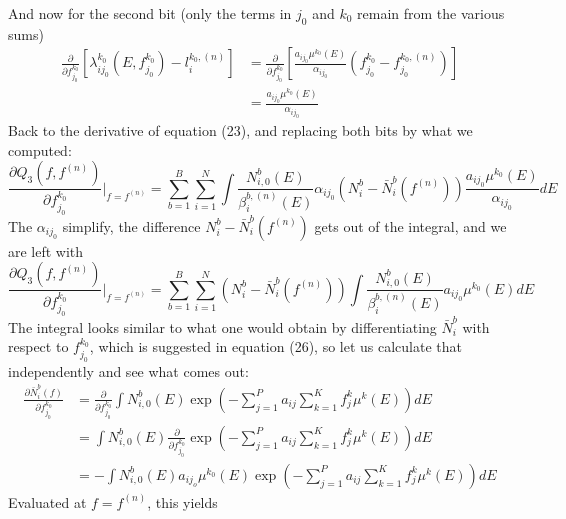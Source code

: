 \documentclass[a4paper, 10pt]{article}
\begin{document}
And now for the second bit (only the terms in $j_0$ and $k_0$ remain from the various sums)
\begin{equation*}
 \begin{split}
   \frac{\partial }{\partial f_{j_0}^{k_0}}\left[ \lambda_{ij_0}^{k_0}(E, f_{j_0}^{k_0}) - l_i^{k_0, (n)} \right] &= \frac{\partial }{\partial f_{j_0}^{k_0}} \left[ \frac{a_{ij_0} \mu^{k_0}(E)}{\alpha_{ij_0}}\left( f_{j_0}^{k_0} - f_{j_0}^{k_0, (n)}\right) \right] \\
   &= \frac{a_{ij_0} \mu^{k_0}(E)}{\alpha_{ij_0}}
 \end{split}
\end{equation*}
Back to the derivative of equation (23), and replacing both bits by what we computed:
\begin{equation*}
  \frac{\partial Q_3\left( f,f^{(n)}\right)}{\partial f_{j_0}^{k_0}}\Bigr|_{f = f^{(n)}} = \sum_{b=1}^B \sum_{i=1}^N \int \frac{N_{i,0}^b(E)}{\beta_i^{b, (n)}(E)} \alpha_{ij_0} \left( N_i^b - \bar{N}_i^b(f^{(n)}) \right) \frac{a_{ij_0} \mu^{k_0}(E)}{\alpha_{ij_0}} dE
\end{equation*}
The $\alpha_{ij_0}$ simplify, the difference $N_i^b - \bar{N}_i^b(f^{(n)})$ gets out of the integral, and we are left with 
\begin{equation*}
  \frac{\partial Q_3\left( f,f^{(n)}\right)}{\partial f_{j_0}^{k_0}}\Bigr|_{f = f^{(n)}} = \sum_{b=1}^B \sum_{i=1}^N \left( N_i^b - \bar{N}_i^b(f^{(n)}) \right) \int \frac{N_{i,0}^b(E)}{\beta_i^{b, (n)}(E)} a_{ij_0} \mu^{k_0}(E) dE
\end{equation*}
The integral looks similar to what one would obtain by differentiating $\bar{N}^b_i$ with respect to $f_{j_0}^{k_0}$, which is suggested in equation (26), so let us calculate that independently and see what comes out:
\begin{equation*}
 \begin{split}
   \frac{\partial \bar{N}^b_i(f)}{\partial f_{j_0}^{k_0}} &= \frac{\partial}{\partial f_{j_0}^{k_0}} \int N_{i,0}^b(E) \exp\left( - \sum_{j=1}^P a_{ij}\sum_{k=1}^K f_j^k \mu^k(E)  \right) dE \\
   &= \int N_{i,0}^b(E) \frac{\partial}{\partial f_{j_0}^{k_0}} \exp\left( - \sum_{j=1}^P a_{ij}\sum_{k=1}^K f_j^k \mu^k(E)  \right) dE \\
   &= - \int N_{i,0}^b(E) a_{ij_o} \mu^{k_0}(E) \exp\left( - \sum_{j=1}^P a_{ij}\sum_{k=1}^K f_j^k \mu^k(E)  \right) dE
 \end{split}
\end{equation*}
Evaluated at $f=f^{(n)}$, this yields
\end{document}
